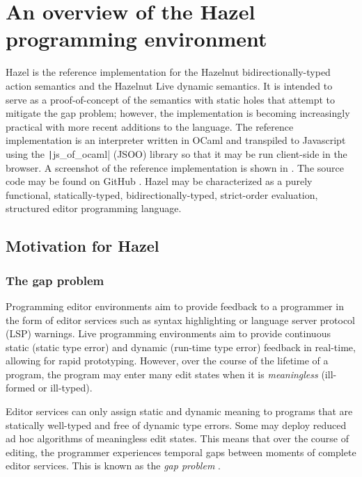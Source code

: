 \chapter{An overview of the Hazel programming environment}
\label{sec:hazel}

Hazel is the reference implementation for the Hazelnut bidirectionally-typed action semantics and the Hazelnut Live dynamic semantics. It is intended to serve as a proof-of-concept of the semantics with static holes that attempt to mitigate the gap problem; however, the implementation is becoming increasingly practical with more recent additions to the language. The reference implementation is an interpreter written in OCaml and transpiled to Javascript using the \texttt|js_of_ocaml| (JSOO) library \cite{vouillon2014bytecode} so that it may be run client-side in the browser. A screenshot of the reference implementation is shown in  \cite{HazelDemo2022}. The source code may be found on GitHub \cite{hazel_git}. Hazel may be characterized as a purely functional, statically-typed, bidirectionally-typed, strict-order evaluation, structured editor programming language.

\section{Motivation for Hazel}
\label{sec:hazel-motivation}

\subsection{The gap problem}
\label{sec:gap-problem}

Programming editor environments aim to provide feedback to a programmer in the form of editor services such as syntax highlighting or language server protocol (LSP) warnings. Live programming environments aim to provide continuous static (static type error) and dynamic (run-time type error) feedback in real-time, allowing for rapid prototyping. However, over the course of the lifetime of a program, the program may enter many edit states when it is \textit{meaningless} (ill-formed or ill-typed).

Editor services can only assign static and dynamic meaning to programs that are statically well-typed and free of dynamic type errors. Some may deploy reduced ad hoc algorithms of meaningless edit states. This means that over the course of editing, the programmer experiences temporal gaps between moments of complete editor services. This is known as the \textit{gap problem} \cite{10.1145/2499370.2462170,conf/popl/HazelnutLive19}.

